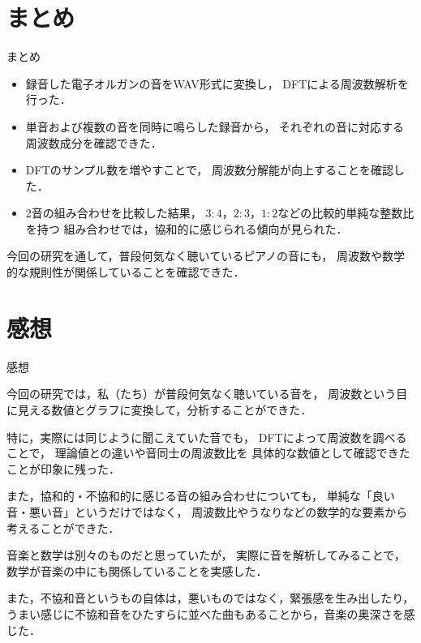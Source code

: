 \documentclass[dvipdfmx,uplatex]{beamer}
\begin{document}
\section{まとめ}

\begin{frame}{まとめ}

  \begin{itemize}

    \item 録音した電子オルガンの音をWAV形式に変換し，
    DFTによる周波数解析を行った．

    \item 単音および複数の音を同時に鳴らした録音から，
    それぞれの音に対応する周波数成分を確認できた．

    \item DFTのサンプル数を増やすことで，
    周波数分解能が向上することを確認した．

    \item 2音の組み合わせを比較した結果，
    $3:4$，$2:3$，$1:2$などの比較的単純な整数比を持つ
    組み合わせでは，協和的に感じられる傾向が見られた．

  \end{itemize}

  今回の研究を通して，普段何気なく聴いているピアノの音にも，
  周波数や数学的な規則性が関係していることを確認できた．

\end{frame}

\section{感想}

\begin{frame}{感想}

  今回の研究では，私（たち）が普段何気なく聴いている音を，
  周波数という目に見える数値とグラフに変換して，分析することができた．

  特に，実際には同じように聞こえていた音でも，
  DFTによって周波数を調べることで，
  理論値との違いや音同士の周波数比を
  具体的な数値として確認できたことが印象に残った．

  また，協和的・不協和的に感じる音の組み合わせについても，
  単純な「良い音・悪い音」というだけではなく，
  周波数比やうなりなどの数学的な要素から
  考えることができた．

  音楽と数学は別々のものだと思っていたが，
  実際に音を解析してみることで，
  数学が音楽の中にも関係していることを実感した．

  また，不協和音というもの自体は，悪いものではなく，緊張感を生み出したり，
  うまい感じに不協和音をひたすらに並べた曲もあることから，音楽の奥深さを感じた．

\end{frame}
\end{document}
